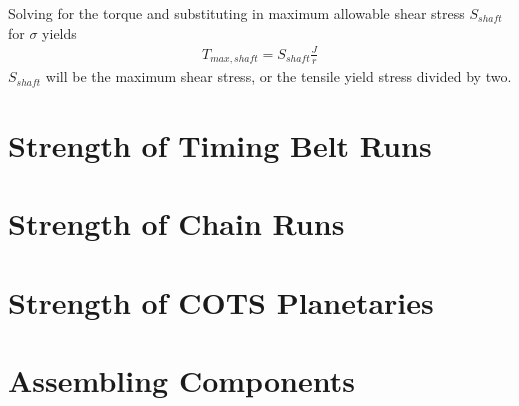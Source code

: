 \documentclass[10pt,letterpaper]{article}
\begin{document}
	Solving for the torque and substituting in maximum allowable shear stress $S_{shaft}$ for $\sigma$ yields
	\begin{align}
		T_{max,shaft} = S_{shaft} \frac{J}{r}
	\end{align}
	$S_{shaft}$ will be the maximum shear stress, or the tensile yield stress divided by two.

\section{Strength of Timing Belt Runs}

\section{Strength of Chain Runs}

\section{Strength of COTS Planetaries}

\section{Assembling Components}
\end{document}
